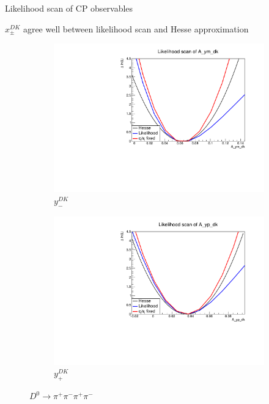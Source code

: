 \documentclass[xcolor={dvipsnames}]{beamer}
\begin{document}
\begin{frame}{Likelihood scan of CP observables}
  \begin{center}
    $x_\pm^{DK}$ agree well between likelihood scan and Hesse approximation
  \end{center}
  \begin{figure}
    \centering
    \begin{subfigure}{0.5\textwidth}
      \centering
      \includegraphics[width=1.0\textwidth]{Plots/A_ym_dk_likelihood_scan_pipipipi.pdf}
      \vspace{-0.3cm}
      \caption*{$y_-^{DK}$}
    \end{subfigure}%
    \begin{subfigure}{0.5\textwidth}
      \centering
      \includegraphics[width=1.0\textwidth]{Plots/A_yp_dk_likelihood_scan_pipipipi.pdf}
      \vspace{-0.3cm}
      \caption*{$y_+^{DK}$}
    \end{subfigure}
    \caption*{$D^0\to\pi^+\pi^-\pi^+\pi^-$}
  \end{figure}
\end{frame}
\end{document}
